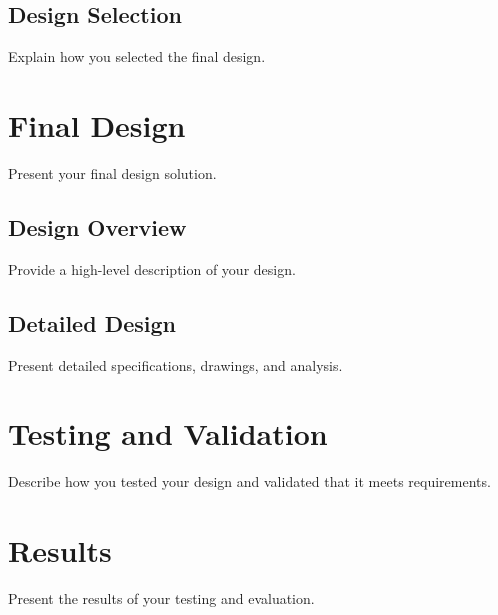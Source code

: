 \documentclass[draft]{../designreport}
\begin{document}
\subsection{Design Selection}

Explain how you selected the final design.

\section{Final Design}

Present your final design solution.

\subsection{Design Overview}

Provide a high-level description of your design.




\subsection{Detailed Design}

Present detailed specifications, drawings, and analysis.

\section{Testing and Validation}

Describe how you tested your design and validated that it meets requirements.

\section{Results}

Present the results of your testing and evaluation.
\end{document}
